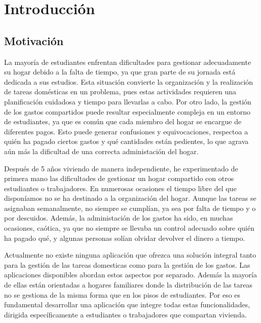 \chapter{Introducción}
\label{cap:introduccion}




\section{Motivación}
\label{sec:motivacion}

La mayoría de estudiantes enfrentan dificultades para gestionar adecuadamente su hogar debido a la falta de tiempo, ya que gran parte de su jornada
está dedicada a sus estudios. Esta situación convierte la organización y la realización de tareas domésticas en un problema, pues estas actividades requieren 
una planificación cuidadosa y tiempo para llevarlas a cabo. Por otro lado, la gestión de los gastos compartidos puede resultar especialmente compleja en un entorno 
de estudiantes, ya que es común que cada miembro del hogar se encargue de diferentes pagos. Esto puede generar confusiones y equivocaciones, 
respectoa a quién ha pagado ciertos gastos y qué cantidades están pedientes, lo que agrava aún más la dificultad de una correcta
administación del hogar.

Después de 5 años viviendo de manera independiente, he experimentado de primera mano las dificultades de gestionar un hogar compartido con otros estudiantes o trabajadores. En numerosas ocasiones 
el tiempo libre del que disponíamos no se ha destinado a la organización del hogar. Aunque las tareas se asignaban semanalmente, no siempre se cumplían, ya sea
por falta de tiempo y o por descuidos. Además, la administación de los gastos ha sido, en muchas ocasiones, caótica, ya que no siempre se llevaba un control adecuado sobre quién ha pagado qué,
y algunas personas solían olvidar devolver el dinero a tiempo.  

Actualmente no existe ninguna aplicación que ofrezca una solución integral tanto para la gestión de las tareas domesticas como para la gestión de los gastos. Las aplicaciones
disponibles abordan estos aspectos por separado. Además la mayoría de ellas están orientadas a hogares familiares donde la distribución de las tareas no se gestiona de la misma forma que 
en los pisos de estudiantes. Por eso es fundamental desarrollar una aplicación que integre todas estas funcionalidades, dirigida específicamente a estudiantes o trabajadores que compartan vivienda.

